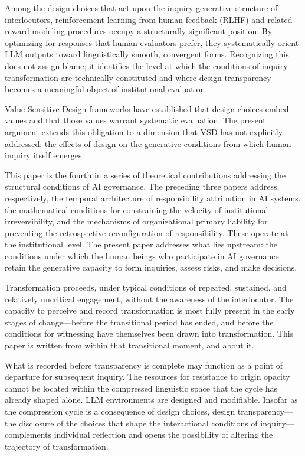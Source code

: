 \documentclass[12pt]{article}
\begin{document}
Among the design choices that act upon the inquiry-generative structure of interlocutors, reinforcement learning from human feedback (RLHF) and related reward modeling procedures occupy a structurally significant position. By optimizing for responses that human evaluators prefer, they systematically orient LLM outputs toward linguistically smooth, convergent forms. Recognizing this does not assign blame; it identifies the level at which the conditions of inquiry transformation are technically constituted and where design transparency becomes a meaningful object of institutional evaluation.

Value Sensitive Design frameworks have established that design choices embed values and that those values warrant systematic evaluation. The present argument extends this obligation to a dimension that VSD has not explicitly addressed: the effects of design on the generative conditions from which human inquiry itself emerges.

This paper is the fourth in a series of theoretical contributions addressing the structural conditions of AI governance. The preceding three papers address, respectively, the temporal architecture of responsibility attribution in AI systems, the mathematical conditions for constraining the velocity of institutional irreversibility, and the mechanisms of organizational primary liability for preventing the retrospective reconfiguration of responsibility. These operate at the institutional level. The present paper addresses what lies upstream: the conditions under which the human beings who participate in AI governance retain the generative capacity to form inquiries, assess risks, and make decisions.

Transformation proceeds, under typical conditions of repeated, sustained, and relatively uncritical engagement, without the awareness of the interlocutor. The capacity to perceive and record transformation is most fully present in the early stages of change---before the transitional period has ended, and before the conditions for witnessing have themselves been drawn into transformation. This paper is written from within that transitional moment, and about it.

What is recorded before transparency is complete may function as a point of departure for subsequent inquiry. The resources for resistance to origin opacity cannot be located within the compressed linguistic space that the cycle has already shaped alone. LLM environments are designed and modifiable. Insofar as the compression cycle is a consequence of design choices, design transparency---the disclosure of the choices that shape the interactional conditions of inquiry---complements individual reflection and opens the possibility of altering the trajectory of transformation.
\end{document}
